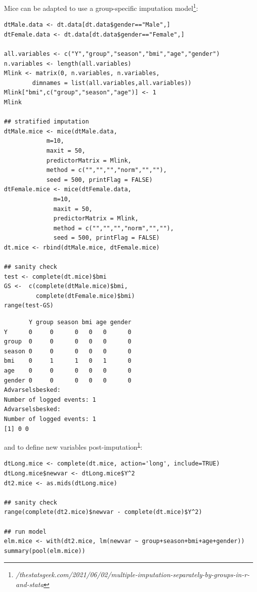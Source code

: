 \documentclass[12pt]{article}
\begin{document}
Mice can be adapted to use a group-specific imputation model\footnote{\emph{/thestatsgeek.com/2021/06/02/multiple-imputation-separately-by-groups-in-r-and-stata}\label{org0b8faff}}:
\lstset{language=r,label= ,caption= ,captionpos=b,numbers=none}
\begin{lstlisting}
dtMale.data <- dt.data[dt.data$gender=="Male",]
dtFemale.data <- dt.data[dt.data$gender=="Female",]

all.variables <- c("Y","group","season","bmi","age","gender")
n.variables <- length(all.variables)
Mlink <- matrix(0, n.variables, n.variables,
		dimnames = list(all.variables,all.variables))
Mlink["bmi",c("group","season","age")] <- 1
Mlink

## stratified imputation
dtMale.mice <- mice(dtMale.data,
		    m=10, 
		    maxit = 50, 
		    predictorMatrix = Mlink,
		    method = c("","","","norm","",""),
		    seed = 500, printFlag = FALSE)
dtFemale.mice <- mice(dtFemale.data,
		      m=10, 
		      maxit = 50,
		      predictorMatrix = Mlink,
		      method = c("","","","norm","",""),
		      seed = 500, printFlag = FALSE)
dt.mice <- rbind(dtMale.mice, dtFemale.mice)

## sanity check
test <- complete(dt.mice)$bmi
GS <-  c(complete(dtMale.mice)$bmi,
	     complete(dtFemale.mice)$bmi)
range(test-GS)
\end{lstlisting}

\begin{verbatim}
       Y group season bmi age gender
Y      0     0      0   0   0      0
group  0     0      0   0   0      0
season 0     0      0   0   0      0
bmi    0     1      1   0   1      0
age    0     0      0   0   0      0
gender 0     0      0   0   0      0
Advarselsbesked:
Number of logged events: 1
Advarselsbesked:
Number of logged events: 1
[1] 0 0
\end{verbatim}

and to define new variables post-imputation\textsuperscript{\ref{org0b8faff}}:
\lstset{language=r,label= ,caption= ,captionpos=b,numbers=none}
\begin{lstlisting}
dtLong.mice <- complete(dt.mice, action='long', include=TRUE)
dtLong.mice$newvar <- dtLong.mice$Y^2
dt2.mice <- as.mids(dtLong.mice)

## sanity check
range(complete(dt2.mice)$newvar - complete(dt.mice)$Y^2)

## run model
elm.mice <- with(dt2.mice, lm(newvar ~ group+season+bmi+age+gender))
summary(pool(elm.mice))
\end{lstlisting}
\end{document}

